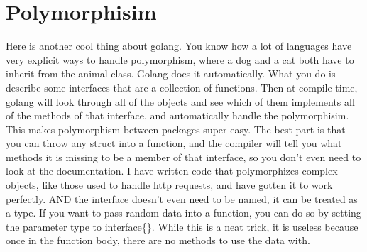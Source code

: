 \documentclass[12pt]{article}
\newcommand{\quest}[1]{\textcolor{dank}{#1}}
\begin{document}
\section{Polymorphisim}
\par Here is another cool thing about golang. You know how a lot of languages have very explicit ways to handle polymorphism, where a dog and a cat both have to inherit from the animal class. Golang does it automatically. What you do is describe some interfaces that are a collection of functions. Then at compile time, golang will look through all of the objects and see which of them implements all of the methods of that interface, and automatically handle the polymorphisim. This makes polymorphism between packages super easy. The best part is that you can throw any struct into a function, and the compiler will tell you what methods it is missing to be a member of that interface, so you don't even need to look at the documentation. I have written code that polymorphizes complex objects, like those used to handle http requests, and have gotten it to work perfectly. AND the interface doesn't even need to be named, it can be treated as a type. If you want to pass random data into a function, you can do so by setting the parameter type to \quest{interface\{\}}. While this is a neat trick, it is useless because once in the function body, there are no methods to use the data with.  
\end{document}
